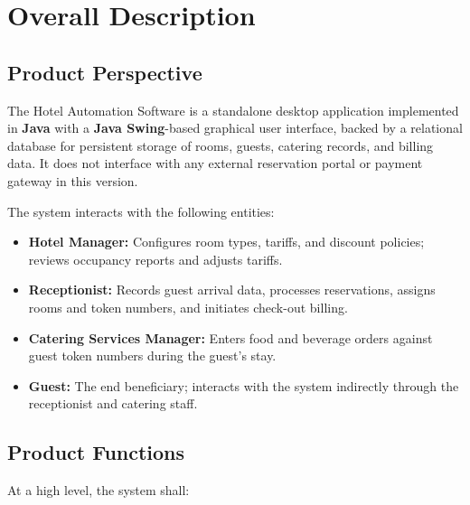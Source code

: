 \documentclass[12pt,a4paper]{article}
\begin{document}
\section{Overall Description}

\subsection{Product Perspective}

The Hotel Automation Software is a standalone desktop application implemented in
\textbf{Java} with a \textbf{Java Swing}-based graphical user interface, backed by a
relational database for persistent storage of rooms, guests, catering records, and
billing data. It does not interface with any external reservation portal or payment
gateway in this version.

The system interacts with the following entities:

\begin{itemize}[leftmargin=1.5em]
  \item \textbf{Hotel Manager:} Configures room types, tariffs, and discount policies;
        reviews occupancy reports and adjusts tariffs.
  \item \textbf{Receptionist:} Records guest arrival data, processes reservations,
        assigns rooms and token numbers, and initiates check-out billing.
  \item \textbf{Catering Services Manager:} Enters food and beverage orders against guest
        token numbers during the guest's stay.
  \item \textbf{Guest:} The end beneficiary; interacts with the system indirectly through
        the receptionist and catering staff.
\end{itemize}

\subsection{Product Functions}

At a high level, the system shall:
\end{document}
